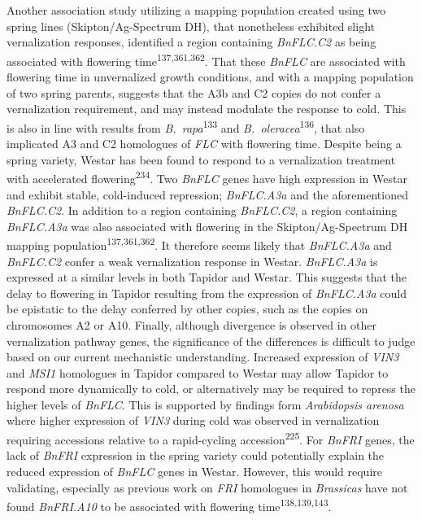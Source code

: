 \documentclass[12pt,]{book}
\begin{document}
Another association study utilizing a mapping population created using
two spring lines (Skipton/Ag-Spectrum DH), that nonetheless exhibited
slight vernalization responses, identified a region containing
\emph{BnFLC.C2} as being associated with flowering
time\textsuperscript{137,361,362}. That these \emph{BnFLC} are
associated with flowering time in unvernalized growth conditions, and
with a mapping population of two spring parents, suggests that the A3b
and C2 copies do not confer a vernalization requirement, and may instead
modulate the response to cold. This is also in line with results from
\emph{B.~rapa}\textsuperscript{133} and
\emph{B.~oleracea}\textsuperscript{136}, that also implicated A3 and C2
homologues of \emph{FLC} with flowering time. Despite being a spring
variety, Westar has been found to respond to a vernalization treatment
with accelerated flowering\textsuperscript{234}. Two \emph{BnFLC} genes
have high expression in Westar and exhibit stable, cold-induced
repression; \emph{BnFLC.A3a} and the aforementioned \emph{BnFLC.C2}. In
addition to a region containing \emph{BnFLC.C2}, a region containing
\emph{BnFLC.A3a} was also associated with flowering in the
Skipton/Ag-Spectrum DH mapping population\textsuperscript{137,361,362}.
It therefore seems likely that \emph{BnFLC.A3a} and \emph{BnFLC.C2}
confer a weak vernalization response in Westar. \emph{BnFLC.A3a} is
expressed at a similar levels in both Tapidor and Westar. This suggests
that the delay to flowering in Tapidor resulting from the expression of
\emph{BnFLC.A3a} could be epistatic to the delay conferred by other
copies, such as the copies on chromosomes A2 or A10. Finally, although
divergence is observed in other vernalization pathway genes, the
significance of the differences is difficult to judge based on our
current mechanistic understanding. Increased expression of \emph{VIN3}
and \emph{MSI1} homologues in Tapidor compared to Westar may allow
Tapidor to respond more dynamically to cold, or alternatively may be
required to repress the higher levels of \emph{BnFLC}. This is supported
by findings form \emph{Arabidopsis arenosa} where higher expression of
\emph{VIN3} during cold was observed in vernalization requiring
accessions relative to a rapid-cycling accession\textsuperscript{225}.
For \emph{BnFRI} genes, the lack of \emph{BnFRI} expression in the
spring variety could potentially explain the reduced expression of
\emph{BnFLC} genes in Westar. However, this would require validating,
especially as previous work on \emph{FRI} homologues in \emph{Brassicas}
have not found \emph{BnFRI.A10} to be associated with flowering
time\textsuperscript{138,139,143}.
\end{document}
